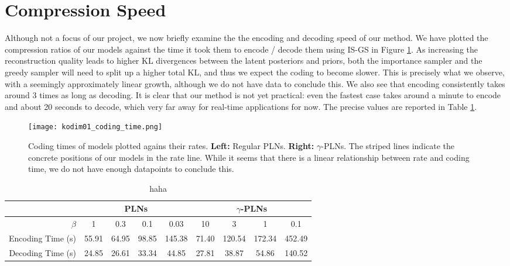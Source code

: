 \section{Compression Speed}
\par
Although not a focus of our project, we now briefly examine the the encoding and
decoding speed of our method. We have plotted the compression ratios of our
models against the time it took them to encode / decode them using IS-GS in
Figure \ref{fig:kodim01_coding_time}. As increasing the reconstruction quality
leads to higher KL divergences between the latent posteriors and priors, both the
importance sampler and the greedy sampler will need to split up a higher total
KL, and thus we expect the coding to become slower. This is precisely what we
observe, with a seemingly approximately linear growth, although we do not have
data to conclude this. We also see that encoding consistently takes around 3
times as long as decoding. It is clear that our method is not yet practical:
even the fastest case takes around a minute to encode and about 20 seconds to
decode, which very far away for real-time applications for now. The precise
values are reported in Table \ref{tab:kodim01_coding_time}.
\begin{figure}
  \centering
  \texttt{[image: kodim01\_coding\_time.png]}
  \caption{Coding times of models plotted agains their rates. \textbf{Left:}
    Regular PLNs. \textbf{Right:} $\gamma$-PLNs. The striped lines indicate
    the concrete positions of our models in the rate line. While it seems
    that there is a
    linear relationship between rate and coding time, we do not have enough
    datapoints to conclude this.}
  \label{fig:kodim01_coding_time}
\end{figure}

\begin{table}[]
  \centering
  \begin{tabular}{|r||c|c|c|c||c|c|c|c|}
    \hline
    & \multicolumn{4}{c||}{\textbf{PLNs}} & \multicolumn{4}{c|}{\textbf{$\gamma$-PLNs}} \\
    \hline 
    $\beta$ & 1 & 0.3 & 0.1 & 0.03 & 10 & 3 & 1 & 0.1 \\ 
    \hline\hline
    Encoding Time (s) & 55.91 & 64.95 & 98.85 & 145.38 & 71.40 & 120.54 & 172.34 & 452.49 \\
    \hline
    Decoding Time (s) & 24.85 & 26.61 & 33.34 & 44.85 & 27.81 & 38.87 & 54.86 & 140.52 \\
    \hline
  \end{tabular}
  \caption{haha}
  \label{tab:kodim01_coding_time}
\end{table}




